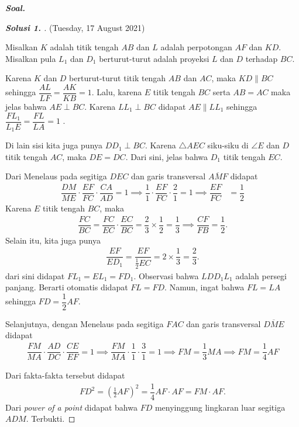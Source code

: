 \textbf{\textit{Soal.}} 
\begin{proof}[\textbf{Solusi 1. }] (Tuesday, 17 August 2021) 
    

    Misalkan $K$ adalah titik tengah $AB$ dan $L$ adalah perpotongan $AF$ dan $KD$. Misalkan pula $L_1$ dan $D_1$ berturut-turut adalah proyeksi $L$ dan $D$ terhadap $BC$.

    Karena $K$ dan $D$ berturut-turut titik tengah $AB$ dan $AC$, maka $KD \parallel BC$ sehingga $\dfrac{AL}{LF} = \dfrac{AK}{KB} = 1$. Lalu, karena $E$ titik tengah $BC$ serta $AB=AC$ maka jelas bahwa $AE \perp BC$. Karena $LL_1 \perp BC$ didapat $AE \parallel LL_1$ sehingga $\dfrac{FL_1}{L_1E} = \dfrac{FL}{LA} = 1$ .

    Di lain sisi kita juga punya $DD_1 \perp BC$. Karena $\triangle AEC$ siku-siku di $\angle E$ dan $D$ titik tengah $AC$, maka $DE=DC$. Dari sini, jelas bahwa $D_1$ titik tengah $EC$.

    Dari Menelaus pada segitiga $DEC$ dan garis transversal $\overline{AMF}$ didapat
    \begin{align*}
        \dfrac{DM}{ME}\cdot \dfrac{EF}{FC} \cdot \dfrac{CA}{AD} = 1 \implies
        \dfrac{1}{1}\cdot \dfrac{EF}{FC} \cdot \dfrac{2}{1} = 1 \implies
        \dfrac{EF}{FC} &= \dfrac{1}{2}
    \end{align*}
    Karena $E$ titik tengah $BC$, maka 
    \begin{align*}
        \dfrac{FC}{BC} = \dfrac{FC}{EC} \cdot \dfrac{EC}{BC} = \dfrac{2}{3} \times \dfrac{1}{2} = \dfrac{1}{3} \implies \dfrac{CF}{FB} = \dfrac{1}{2}.
    \end{align*}
    Selain itu, kita juga punya
    \begin{align*}
        \dfrac{EF}{ED_1} = \dfrac{EF}{\frac{1}{2}EC} = 2 \times \dfrac{1}{3} = \dfrac{2}{3}.
    \end{align*}
    dari sini didapat $FL_1 = EL_1 = FD_1$. Observasi bahwa $LDD_1L_1$ adalah persegi panjang. Berarti otomatis didapat $FL = FD$. Namun, ingat bahwa $FL = LA$ sehingga $FD = \dfrac{1}{2}AF$.

    Selanjutnya, dengan Menelaus pada segitiga $FAC$ dan garis transversal $\overline{DME}$ didapat
    \begin{align*}
        \dfrac{FM}{MA} \cdot \dfrac{AD}{DC} \cdot \dfrac{CE}{EF} = 1 \implies \dfrac{FM}{MA} \cdot \dfrac{1}{1} \cdot \dfrac{3}{1} = 1 \implies FM = \dfrac{1}{3} MA \implies FM = \dfrac{1}{4} AF
    \end{align*}

    Dari fakta-fakta tersebut didapat
    \begin{align*}
        FD^2 = \left(\frac{1}{2}AF\right)^2 = \dfrac{1}{4} AF \cdot AF = FM \cdot AF.
    \end{align*}
    Dari \textit{power of a point} didapat bahwa $FD$ menyinggung lingkaran luar segitiga $ADM$. Terbukti.
\end{proof}
